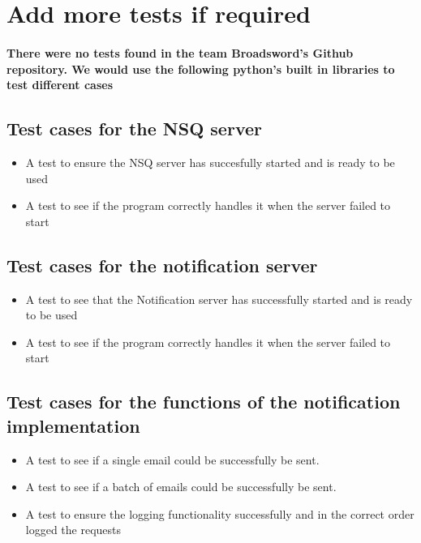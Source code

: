 \documentclass[11pt]{article}
\begin{document}
			\paragraph{}

	\section{Add more tests if required}
		\paragraph{There were no tests found in the team Broadsword's Github repository. We would use the following python's built in libraries to test different cases}
		\subsection{Test cases for the NSQ server}	
			\begin{itemize}
				\item A test to ensure the NSQ server has succesfully started and is ready to be used
				\item A test to see if the program correctly handles it when the server failed to start
			\end{itemize}
		\subsection{Test cases for the notification server}
			\begin{itemize}
				\item A test to see that the Notification server has successfully started and is ready to be used
				\item A test to see if the program correctly handles it when the server failed to start	
			\end{itemize}
		\subsection{Test cases for the functions of the notification implementation}
			\begin{itemize}
				\item A test to see if a single email could be successfully be sent.
				\item A test to see if a batch of emails could be successfully be sent.
				\item A test to ensure the logging functionality successfully and in the correct order logged the requests
			\end{itemize}


	
	
\end{document}
